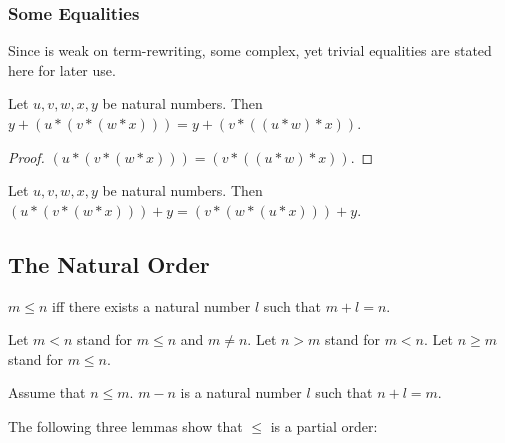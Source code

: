 \documentclass[english,11pt]{article}
\begin{document}
\subsubsection{Some Equalities}

Since \Naproche is weak on term-rewriting, some complex, yet trivial equalities are stated
here for later use.

\begin{forthel}

\begin{lemma}
Let $u,v,w,x,y$ be natural numbers. 
Then $y + (u * (v * (w * x))) = y + (v * ((u * w) * x))$.
\end{lemma}
\begin{proof}
$(u * (v * (w * x))) = (v * ((u * w) * x))$.
\end{proof}

\begin{lemma}
Let $u,v,w,x,y$ be natural numbers. Then  $(u * (v * (w * x))) + y = (v * (w * (u * x))) + y$.
\end{lemma}


\end{forthel}


\subsection{The Natural Order}

\begin{forthel}

\begin{definition}
$m \leq n$ iff
there exists a natural number $l$ such that $m + l = n$.
\end{definition}

Let $m < n$ stand for $m \leq n$ and $m \neq n$.
Let $n > m$ stand for $m < n$.
Let $n \geq m$ stand for $m \leq n$.


\begin{definition}
Assume that $n \leq m$.
$m - n$ is a natural number $l$ such that $n + l  = m$.
\end{definition}

\end{forthel}

The following three lemmas show that $\leq$ is a partial order:
\end{document}
